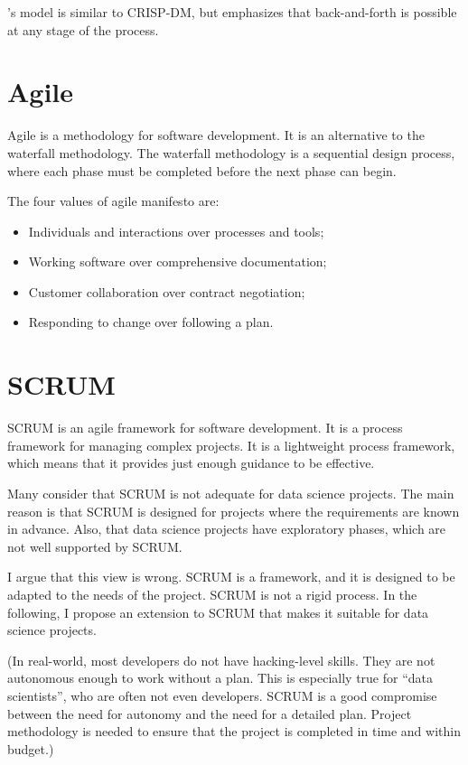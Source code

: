 \citeauthor{Zumel2019}'s model is similar to CRISP-DM, but emphasizes that back-and-forth
is possible at any stage of the process.

\section{Agile}

Agile is a methodology for software development.  It is an alternative to the waterfall
methodology.  The waterfall methodology is a sequential design process, where each phase
must be completed before the next phase can begin.

The four values of agile manifesto are:
\begin{itemize}
  \item Individuals and interactions over processes and tools;
  \item Working software over comprehensive documentation;
  \item Customer collaboration over contract negotiation;
  \item Responding to change over following a plan.
\end{itemize}

\section{SCRUM}

SCRUM is an agile framework for software development.  It is a process framework for
managing complex projects.  It is a lightweight process framework, which means that it
provides just enough guidance to be effective.

Many consider that SCRUM is not adequate for data science projects.  The main reason is
that SCRUM is designed for projects where the requirements are known in advance.  Also,
that data science projects have exploratory phases, which are not well supported by SCRUM.

I argue that this view is wrong.  SCRUM is a framework, and it is designed to be adapted to
the needs of the project.  SCRUM is not a rigid process.  In the following, I propose an
extension to SCRUM that makes it suitable for data science projects.

(In real-world, most developers do not have hacking-level skills.  They are not autonomous
enough to work without a plan.  This is especially true for ``data scientists'', who are
often not even developers.  SCRUM is a good compromise between the need for autonomy and
the need for a detailed plan.  Project methodology is needed to ensure that the project is
completed in time and within budget.)

